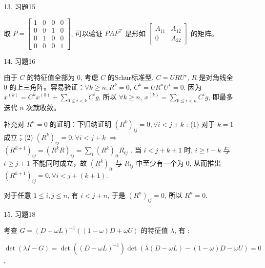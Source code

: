 \documentclass{article}
\begin{document}
\begin{spacing}{1.5}
\begin{itemize}
    \item [13.] 习题15
    
    取 $P = \left[\begin{array}{cccc}1&0&0&0\\0&0&1&0\\0&1&0&0\\0&0&0&1\end{array}\right]$, 可以验证 $PAP^\top$ 是形如 $\left[\begin{array}{cc}A_{11}&A_{12}\\0&A_{22}\end{array}\right]$ 的矩阵。

    \item [14.] 习题16
    
    由于 $C$ 的特征值全部为 $0$, 考虑 $C$ 的Schur标准型, $C = URU^\star$, $R$ 是对角线全 $0$ 的上三角阵。容易验证：$\forall k\geq n, R^k = 0$, $C^k = UR^n U^\star = 0$. 因为 $x^{(k)} = C^{k}x^{(0)} + \sum_{0\leq i < k} C^{i}g$, 所以 $\forall k\geq n$, $x^{(k)} = \sum_{0\leq i < n} C^{i}g$, 即最多迭代 $n$ 次就收敛。

    补充对 $R^n=0$ 的证明：下归纳证明 $(R^{k})_{ij} = 0, \forall i < j + k$ : (1) 对于 $k=1$ 成立；(2) $(R^k)_{ij} = 0, \forall i < j + k$ $\Rightarrow$ $(R^{k+1})_{ij} = (R^k R)_{ij} = \sum_t (R^k)_{it} R_{tj}$ . 当 $i < j + k + 1$ 时, $i \geq t + k$ 与 $t \geq j + 1$ 不能同时成立，故 $(R^k)_{it}$ 与 $R_{tj}$ 中至少有一个为 $0$, 从而推出 $(R^{k+1})_{ij} = 0, \forall i < j + (k + 1)$.

    对于任意 $1\leq i,j\leq n$, 有 $i < j + n$, 于是 $(R^n)_{ij} = 0$, 所以 $R^n = 0$.

    \item [15.] 习题18
    
    考查 $G = (D - \omega L)^{-1}\left((1-\omega)D + \omega U\right)$ 的特征值 $\lambda$, 有 :
    
    $\det(\lambda I - G) = \det\left((D - \omega L)^{-1}\right)\det\left(\lambda(D - \omega L) - (1-\omega)D - \omega U\right)=0$,


\end{itemize}
\end{spacing}
\end{document}
